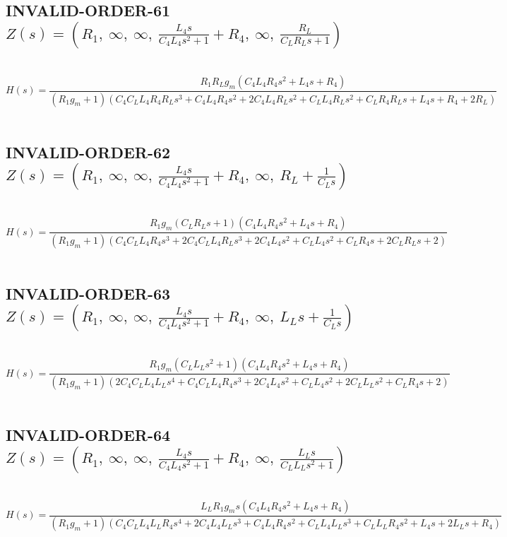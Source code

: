 \documentclass{article}
\begin{document}
\subsection{INVALID-ORDER-61 $Z(s) = \left( R_{1}, \  \infty, \  \infty, \  \frac{L_{4} s}{C_{4} L_{4} s^{2} + 1} + R_{4}, \  \infty, \  \frac{R_{L}}{C_{L} R_{L} s + 1}\right)$ } \ 
\textbf{\[H(s) = \frac{R_{1} R_{L} g_{m} \left(C_{4} L_{4} R_{4} s^{2} + L_{4} s + R_{4}\right)}{\left(R_{1} g_{m} + 1\right) \left(C_{4} C_{L} L_{4} R_{4} R_{L} s^{3} + C_{4} L_{4} R_{4} s^{2} + 2 C_{4} L_{4} R_{L} s^{2} + C_{L} L_{4} R_{L} s^{2} + C_{L} R_{4} R_{L} s + L_{4} s + R_{4} + 2 R_{L}\right)}\] } \ 
\subsection{INVALID-ORDER-62 $Z(s) = \left( R_{1}, \  \infty, \  \infty, \  \frac{L_{4} s}{C_{4} L_{4} s^{2} + 1} + R_{4}, \  \infty, \  R_{L} + \frac{1}{C_{L} s}\right)$ } \ 
\textbf{\[H(s) = \frac{R_{1} g_{m} \left(C_{L} R_{L} s + 1\right) \left(C_{4} L_{4} R_{4} s^{2} + L_{4} s + R_{4}\right)}{\left(R_{1} g_{m} + 1\right) \left(C_{4} C_{L} L_{4} R_{4} s^{3} + 2 C_{4} C_{L} L_{4} R_{L} s^{3} + 2 C_{4} L_{4} s^{2} + C_{L} L_{4} s^{2} + C_{L} R_{4} s + 2 C_{L} R_{L} s + 2\right)}\] } \ 
\subsection{INVALID-ORDER-63 $Z(s) = \left( R_{1}, \  \infty, \  \infty, \  \frac{L_{4} s}{C_{4} L_{4} s^{2} + 1} + R_{4}, \  \infty, \  L_{L} s + \frac{1}{C_{L} s}\right)$ } \ 
\textbf{\[H(s) = \frac{R_{1} g_{m} \left(C_{L} L_{L} s^{2} + 1\right) \left(C_{4} L_{4} R_{4} s^{2} + L_{4} s + R_{4}\right)}{\left(R_{1} g_{m} + 1\right) \left(2 C_{4} C_{L} L_{4} L_{L} s^{4} + C_{4} C_{L} L_{4} R_{4} s^{3} + 2 C_{4} L_{4} s^{2} + C_{L} L_{4} s^{2} + 2 C_{L} L_{L} s^{2} + C_{L} R_{4} s + 2\right)}\] } \ 
\subsection{INVALID-ORDER-64 $Z(s) = \left( R_{1}, \  \infty, \  \infty, \  \frac{L_{4} s}{C_{4} L_{4} s^{2} + 1} + R_{4}, \  \infty, \  \frac{L_{L} s}{C_{L} L_{L} s^{2} + 1}\right)$ } \ 
\textbf{\[H(s) = \frac{L_{L} R_{1} g_{m} s \left(C_{4} L_{4} R_{4} s^{2} + L_{4} s + R_{4}\right)}{\left(R_{1} g_{m} + 1\right) \left(C_{4} C_{L} L_{4} L_{L} R_{4} s^{4} + 2 C_{4} L_{4} L_{L} s^{3} + C_{4} L_{4} R_{4} s^{2} + C_{L} L_{4} L_{L} s^{3} + C_{L} L_{L} R_{4} s^{2} + L_{4} s + 2 L_{L} s + R_{4}\right)}\] } \ 
\end{document}
